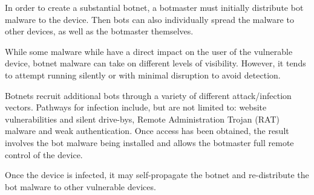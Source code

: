 \raggedright
In order to create a substantial botnet, a botmaster must initially
distribute bot malware to the device. Then bots can also individually
spread the malware to other devices, as well as the botmaster themselves\textsuperscript{\cite{atluri2017botnets}}.

\vspace{0.5cm}

While some malware while have a direct impact on the user of the vulnerable
device, botnet malware can take on different levels of visibility. However,
it tends to attempt running silently or with minimal disruption to avoid
detection.

Botnets recruit additional bots through a variety of different attack/infection
vectors. Pathways for infection include, but are not limited to: website vulnerabilities
and silent drive-bys, Remote Administration Trojan (RAT) malware and weak authentication.
Once access has been obtained, the result involves the bot malware being installed and
allows the botmaster full remote control of the device.

\vspace{0.5cm}

Once the device is infected, it may self-propagate the botnet and re-distribute the bot
malware to other vulnerable devices.